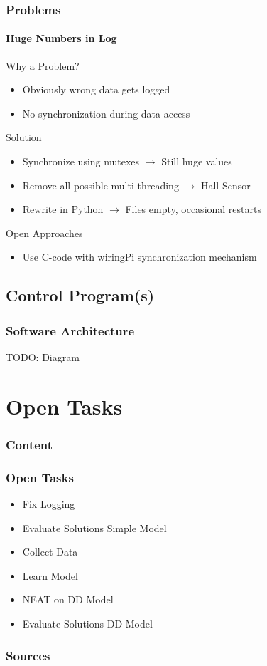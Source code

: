 \documentclass[8pt]{beamer}
\begin{document}
\begin{frame}
	\frametitle{Problems}
	\framesubtitle{Huge Numbers in Log}
	\begin{block}{Why a Problem?}
		\begin{itemize}
			\item Obviously wrong data gets logged
			\item No synchronization during data access
		\end{itemize}
	\end{block}
	\pause
	\begin{block}{Solution}
		\begin{itemize}[<+->]
			\item Synchronize using mutexes $\rightarrow$ Still huge values
			\item Remove all possible multi-threading $\rightarrow$ Hall Sensor
			\item Rewrite in Python $\rightarrow$ Files empty, occasional restarts
		\end{itemize}
	\end{block}	
	\pause
	\begin{block}{Open Approaches}
		\begin{itemize}
			\item Use C-code with wiringPi synchronization mechanism
		\end{itemize}
	\end{block}
\end{frame}

\subsection{Control Program(s)}
\begin{frame}
	\frametitle{Software Architecture}
	TODO: Diagram
\end{frame}



\section{Open Tasks}
\begin{frame}
	\frametitle{Content}
\end{frame}

\begin{frame}
	\frametitle{Open Tasks}
	\begin{block}{}
		\begin{itemize}
			\item Fix Logging
			\item Evaluate Solutions Simple Model
			\item Collect Data
			\item Learn Model
			\item NEAT on DD Model
			\item Evaluate Solutions DD Model
		\end{itemize}
	\end{block}
\end{frame}

\begin{frame}[allowframebreaks]
\frametitle{Sources}



\end{frame}
\end{document}
